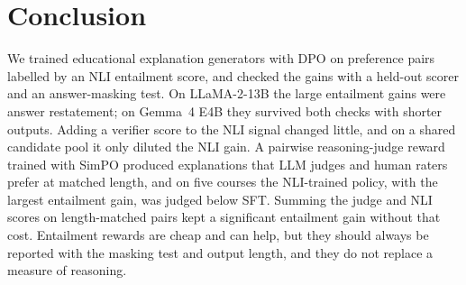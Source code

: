 \section{Conclusion}

We trained educational explanation generators with DPO on preference pairs labelled by an NLI entailment score, and checked the gains with a held-out scorer and an answer-masking test. On LLaMA-2-13B the large entailment gains were answer restatement; on Gemma~4 E4B they survived both checks with shorter outputs. Adding a verifier score to the NLI signal changed little, and on a shared candidate pool it only diluted the NLI gain. A pairwise reasoning-judge reward trained with SimPO produced explanations that LLM judges and human raters prefer at matched length, and on five courses the NLI-trained policy, with the largest entailment gain, was judged below SFT. Summing the judge and NLI scores on length-matched pairs kept a significant entailment gain without that cost. Entailment rewards are cheap and can help, but they should always be reported with the masking test and output length, and they do not replace a measure of reasoning.
